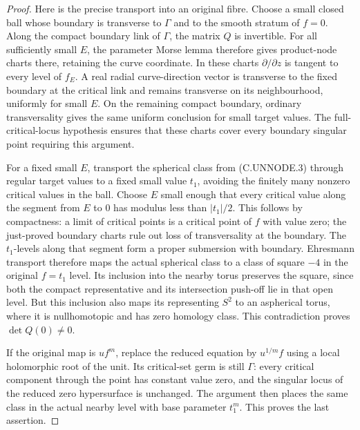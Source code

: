 \begin{proof}
Here is the precise transport into an original
fibre. Choose a small closed ball whose boundary
is transverse to $\Gamma$ and to the smooth
stratum of $f=0$. Along the compact boundary link
of $\Gamma$, the matrix $Q$ is invertible.
For all sufficiently small $E$, the parameter
Morse lemma therefore gives product-node charts
there, retaining the curve coordinate. In these
charts $\partial/\partial z$ is tangent to every
level of $f_E$. A real radial curve-direction
vector is transverse to the fixed boundary at
the critical link and remains transverse on its
neighbourhood, uniformly for small $E$. On the
remaining compact boundary, ordinary transversality
gives the same uniform conclusion for small target
values. The full-critical-locus hypothesis ensures
that these charts cover every boundary singular
point requiring this argument.

For a fixed small $E$, transport the spherical
class from (C.UNNODE.3) through regular target values
to a fixed small value $t_1$, avoiding the finitely
many nonzero critical values in the ball. Choose
$E$ small enough that every critical value along
the segment from $E$ to $0$ has modulus less than
$|t_1|/2$. This follows by compactness: a limit of
critical points is a critical point of $f$ with
value zero; the just-proved boundary charts rule
out loss of transversality at the boundary.
The $t_1$-levels along that segment form a proper
submersion with boundary. Ehresmann transport
therefore maps the actual spherical class to a
class of square $-4$ in the original $f=t_1$ level.
Its inclusion into the nearby torus preserves
the square, since both the compact representative
and its intersection push-off lie in that open
level. But this inclusion also maps its representing
$S^2$ to an aspherical torus, where it is
nullhomotopic and has zero homology class. This
contradiction proves $\det Q(0)\ne0$.

If the original map is $u f^m$, replace the reduced
equation by $u^{1/m}f$ using a local holomorphic
root of the unit. Its critical-set germ is still
$\Gamma$: every critical component through the
point has constant value zero, and the singular
locus of the reduced zero hypersurface is unchanged.
The argument then places the
same class in the actual nearby level with base
parameter $t_1^m$. This proves the last assertion.
\end{proof}

